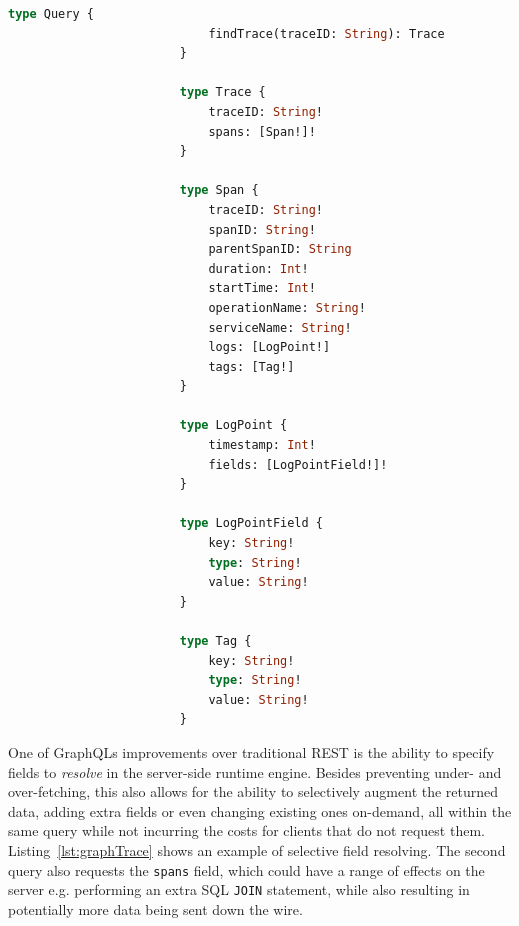 \documentclass[12pt,pdftex,titlepage]{report}
\begin{document}
                    \begin{lstlisting}[caption={The base GraphQL schema, defining a query and data types for the trace data.}, language=GraphQL, gobble=24]
                        type Query {
                            findTrace(traceID: String): Trace
                        }

                        type Trace {
                            traceID: String!
                            spans: [Span!]!
                        }

                        type Span {
                            traceID: String!
                            spanID: String!
                            parentSpanID: String
                            duration: Int!
                            startTime: Int!
                            operationName: String!
                            serviceName: String!
                            logs: [LogPoint!]
                            tags: [Tag!]
                        }

                        type LogPoint {
                            timestamp: Int!
                            fields: [LogPointField!]!
                        }

                        type LogPointField {
                            key: String!
                            type: String!
                            value: String!
                        }

                        type Tag {
                            key: String!
                            type: String!
                            value: String!
                        }
                    \end{lstlisting}
                    
                    One of GraphQLs improvements over traditional REST is the ability to specify fields to \textit{resolve} in the server-side runtime engine. Besides preventing
                    under- and over-fetching, this also allows for the ability to selectively augment the returned data, adding extra fields or even changing existing ones on-demand,
                    all within the same query while not incurring the costs for clients that do not request them. Listing~\ref{lst:graphTrace} shows an example of selective field
                    resolving. The second query also requests the \texttt{spans} field, which could have a range of effects on the server e.g. performing an extra SQL \texttt{JOIN}
                    statement, while also resulting in potentially more data being sent down the wire.
\end{document}
